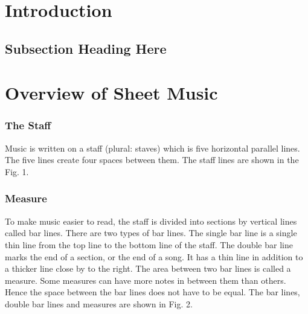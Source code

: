\documentclass[journal]{IEEEtran}
\begin{document}
%
\IEEEpeerreviewmaketitle



\section{Introduction}

\subsection{Subsection Heading Here}

\section{Overview of Sheet Music}
\subsubsection{The Staff}
Music is written on a staff (plural: staves) which is five horizontal parallel lines. The five lines
create four spaces between them. The staff lines are shown in the Fig. 1.

\subsubsection{Measure}
To make music easier to read, the staff is divided into sections by vertical lines called bar lines.
There are two types of bar lines. The single bar line is a single thin line from the top line to the
bottom line of the staff. The double bar line marks the end of a section, or the end of a song. It has
a thin line in addition to a thicker line close by to the right.
The area between two bar lines is called a measure. Some measures can have more notes in
between them than others. Hence the space between the bar lines does not have to be equal. The
bar lines, double bar lines and measures are shown in Fig. 2.
\end{document}
